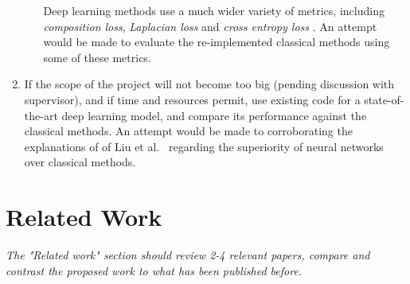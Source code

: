 \documentclass{article}
\begin{document}
\begin{multicols}{2}[]
\begin{enumerate}[label=\arabic*.]
\begin{itemize}
        Deep learning methods use a much wider variety of metrics, including \emph{composition loss}, \emph{Laplacian loss} and \emph{cross entropy loss} \cite{dnn-survey}. An attempt would be made to evaluate the re-implemented classical methods using some of these metrics.
    \end{itemize}
    \item If the scope of the project will not become too big (pending discussion with supervisor), and if time and resources permit, use existing code for a state-of-the-art deep learning model, and compare its performance against the classical methods. An attempt would be made to corroborating the explanations of of Liu et al.\ \cite{sota-composition-1k} regarding the superiority of neural networks over classical methods.
\end{enumerate}







\section{Related Work}
\emph{The "Related work" section should review 2-4 relevant papers, compare and contrast the proposed work to what has been published before.}




%


\end{multicols}
\end{document}
